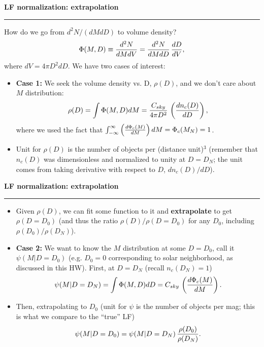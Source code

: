 \documentclass[letterpaper,landscape]{slides}
\begin{document}
 
\begin{slide}
\begin{center}
\bfseries
{\large {\color{red} LF normalization: extrapolation}}
\end{center}
\vskip 0.2in
\hrule
{\color{blue} How do we go from $d^2 N / (dM dD)$ to volume density? } 
\begin{equation}
  \Phi(M,D) \equiv  {d^2 N \over dM dV } =    {d^2 N \over dM dD }  \, {dD \over dV},
\end{equation}
where $dV = 4\pi D^2 dD$. We have two cases of interest: 
\begin{itemize}
\item {\bf Case 1:} We seek the volume density vs. D, $\rho(D)$, and we don't care about $M$ distribution:
\begin{equation}
   \rho(D) = \int \Phi(M,D) dM = {C_{sky} \over 4\pi D^2} \, \left( {d n_c(D) \over d D} \right),
\end{equation}
where we used the fact that $\int_{-\infty}^\infty  \left( {d \Phi_c(M) \over dM } \right)   dM = \Phi_c(M_N)=1$. 
\item Unit for $\rho(D)$ is the number of objects per (distance unit)$^3$ (remember that 
$n_c(D)$ was dimensionless and normalized to unity at $D=D_N$; the unit comes from 
taking derivative with respect to $D$, $d n_c(D) /d D$).  
\end{itemize}

\vfill
\end{slide}
 
\begin{slide}
\begin{center}
\bfseries
{\large {\color{red} LF normalization: extrapolation}}
\end{center}
\vskip 0.2in
\hrule
\begin{itemize}
\item Given $\rho(D)$, we can fit some function to it and {\bf extrapolate} to get $\rho(D=D_0)$
(and thus the ratio $\rho(D)/\rho(D=D_0)$ for any $D_0$, including $\rho(D_0)/\rho(D_N)$). 
\item {\bf Case 2:} We want to know the $M$ distribution at some $D=D_0$, call it  $\psi(M | D=D_0) $ 
(e.g. $D_0=0$ corresponding to solar neighborhood, as discussed in this HW). First, at $D=D_N$
(recall  $n_c(D_N)=1$)
\begin{equation}
   \psi(M | D=D_N) = \int \Phi(M,D) dD = C_{sky} \, \left( {d \Phi_c(M) \over dM } \right). 
\end{equation}
\item Then, extrapolating to $D_0$ (unit for $\psi$ is the number of objects per mag; this
is what we compare to the ``true'' LF)
\begin{equation}
   \psi(M | D=D_0) =  \psi(M | D=D_N) \, {\rho(D_0)  \over \rho(D_N) }.
\end{equation}
\end{itemize}

\vfill
\end{slide}
 
\end{document}
